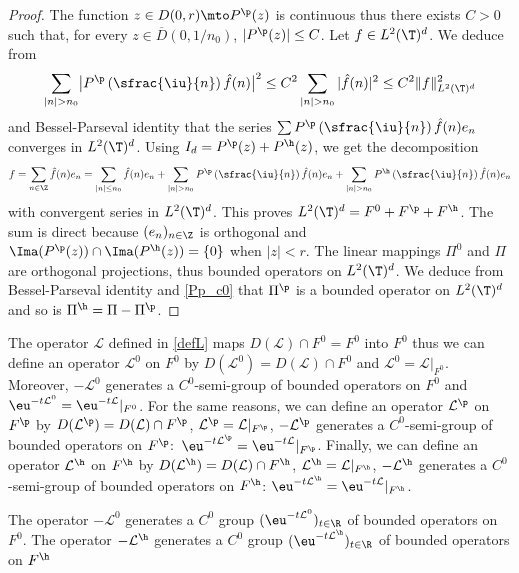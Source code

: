 \begin{proof}
The function $z \in D(0,r) \mto P^\p(z)$ is continuous thus there exists $C>0$ such that, for every $z \in \overline{D}(0,1/n_0)$, $|P^\p(z)|\leq C$. Let $f \in L^2(\T)^d$. We deduce from
\begin{equation} \label{Pp_c0}
\sum_{|n| > n_0} \bigl| P^\p\left(\sfrac{\iu}{n}\right) \hat{f}(n) \bigr|^2 \leq C^2
\sum_{|n| > n_0} |\hat{f}(n)|^2 \leq C^2 \|f\|_{L^2(\T)^d}^2
\end{equation}
and Bessel-Parseval identity that the series $\sum P^\p\left(\sfrac{\iu}{n}\right) \hat{f}(n) e_n$ converges in $L^2(\T)^d$.
Using $I_d=P^\p(z)+P^\h(z)$, we get the decomposition
\[
f = \sum_{n\in\Z} \hat{f}(n) e_n =
\sum_{|n|\leq n_0} \hat{f}(n) e_n +
\sum_{|n| > n_0} P^\p\left(\sfrac{\iu}{n}\right) \hat{f}(n) e_n +
\sum_{|n| > n_0} P^\h\left(\sfrac{\iu}{n}\right) \hat{f}(n) e_n
\]
with convergent series in $L^2(\T)^d$.
This proves $L^2(\T)^{d} = F^0 + F^\p + F^\h$. The sum is direct because $(e_n)_{n\in\Z}$ is orthogonal and $\Ima(P^\p(z))\cap\Ima(P^\h(z))=\{0\}$ when $|z|<r$.
The linear mappings $\Pi^0$ and $\Pi$ are orthogonal projections, thus bounded operators on $L^2(\T)^d$. We deduce from Bessel-Parseval identity and \eqref{Pp_c0} that
$\Pi^\p$ is a bounded operator on $L^2(\T)^d$ and so is $\Pi^\h=\Pi-\Pi^\p$.
\end{proof}

The operator $\mathcal{L}$ defined in \eqref{defL} maps $D(\mathcal{L})\cap F^0 = F^0$ into $F^0$ thus we can define an operator $\mathcal{L}^0$ on $F^0$ by
$D(\mathcal{L}^0)=D(\mathcal{L})\cap F^0$ and $\mathcal{L}^0=\mathcal{L}|_{F^0}$. Moreover, $-\mathcal{L}^0$ generates a $C^0$-semi-group of bounded operators on $F^0$ and $\eu^{-t\mathcal{L}^0}=\eu^{-t\mathcal{L}}|_{F^0}$.
For the same reasons, we can define an operator $\mathcal{L}^\p$ on $F^\p$ by $D(\mathcal{L}^\p)=D(\mathcal{L})\cap F^\p$, $\mathcal{L}^\p=\mathcal{L}|_{F^\p}$, $-\mathcal{L}^\p$ generates a $C^0$-semi-group of bounded operators on \hbox{$F^\p$: $\eu^{-t\mathcal{L}^\p}=\eu^{-t\mathcal{L}}|_{F^\p}$}.
Finally, we can define an operator $\mathcal{L}^\h$ on $F^\h$ by $D(\mathcal{L}^\h)=D(\mathcal{L})\cap F^\h$, $\mathcal{L}^\h=\mathcal{L}|_{F^\h}$, $-\mathcal{L}^\h$ generates a $C^0$-semi-group of bounded operators on $F^\h$: $\eu^{-t\mathcal{L}^\h}=\eu^{-t\mathcal{L}}|_{F^\h}$.

\begin{prop}\label{ExtendSemigroups}
The operator $-\mathcal{L}^0$ generates a $C^0$ group $(\eu^{-t\mathcal{L}^0})_{t\in\R}$ of bounded operators on $F^0$.
The operator $-\mathcal{L}^\h$ generates a $C^0$ group $(\eu^{-t\mathcal{L}^\h})_{t\in\R}$ of bounded operators on $F^\h$
\end{prop}

